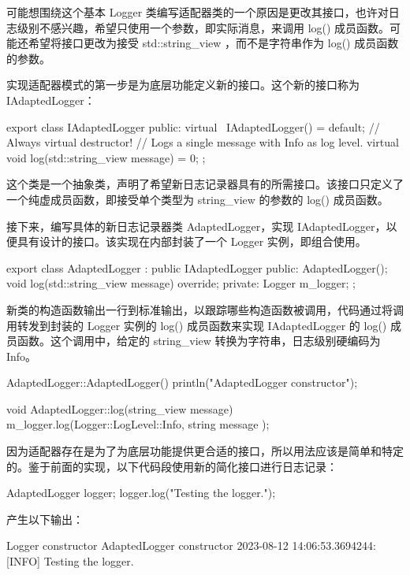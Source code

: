 可能想围绕这个基本 Logger 类编写适配器类的一个原因是更改其接口，也许对日志级别不感兴趣，希望只使用一个参数，即实际消息，来调用 log() 成员函数。可能还希望将接口更改为接受 std::string\_view ，而不是字符串作为 log() 成员函数的参数。


实现适配器模式的第一步是为底层功能定义新的接口。这个新的接口称为 IAdaptedLogger：

\begin{cpp}
export class IAdaptedLogger
{
    public:
        virtual ~IAdaptedLogger() = default; // Always virtual destructor!
        // Logs a single message with Info as log level.
        virtual void log(std::string_view message) = 0;
};
\end{cpp}

这个类是一个抽象类，声明了希望新日志记录器具有的所需接口。该接口只定义了一个纯虚成员函数，即接受单个类型为 string\_view 的参数的 log() 成员函数。

接下来，编写具体的新日志记录器类 AdaptedLogger，实现 IAdaptedLogger，以便具有设计的接口。该实现在内部封装了一个 Logger 实例，即组合使用。

\begin{cpp}
export class AdaptedLogger : public IAdaptedLogger
{
    public:
        AdaptedLogger();
        void log(std::string_view message) override;
    private:
        Logger m_logger;
};
\end{cpp}

新类的构造函数输出一行到标准输出，以跟踪哪些构造函数被调用，代码通过将调用转发到封装的 Logger 实例的 log() 成员函数来实现 IAdaptedLogger 的 log() 成员函数。这个调用中，给定的 string\_view 转换为字符串，日志级别硬编码为 Info。

\begin{cpp}
AdaptedLogger::AdaptedLogger() { println("AdaptedLogger constructor"); }

void AdaptedLogger::log(string_view message)
{
    m_logger.log(Logger::LogLevel::Info, string { message });
}
\end{cpp}


因为适配器存在是为了为底层功能提供更合适的接口，所以用法应该是简单和特定的。鉴于前面的实现，以下代码段使用新的简化接口进行日志记录：

\begin{cpp}
AdaptedLogger logger;
logger.log("Testing the logger.");
\end{cpp}

产生以下输出：

\begin{shell}
Logger constructor
AdaptedLogger constructor
2023-08-12 14:06:53.3694244: [INFO] Testing the logger.
\end{shell}











